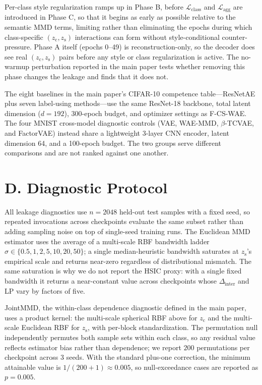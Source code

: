 \documentclass[letterpaper]{article} %
\newcommand{\ours}{F-CS-WAE}
\newcommand{\zc}{z_{\mathrm{c}}}
\newcommand{\zs}{z_{\mathrm{s}}}
\newcommand{\Dinter}{\Delta_{\mathrm{inter}}}
\begin{document}
Per-class style regularization ramps up in Phase B, before
$\mathcal{L}_{\mathrm{class}}$ and $\mathcal{L}_{\mathrm{agg}}$ are
introduced in Phase C, so that it begins as early as possible relative to the
semantic MMD terms, limiting rather than eliminating the epochs during which
class-specific $(\zc,\zs)$ interactions can form without style-conditional
counter-pressure. Phase A itself (epochs 0--49) is reconstruction-only, so
the decoder does see real $(\zc,\zs)$ pairs before any style or class
regularization is active. The no-warmup perturbation reported in the main
paper tests whether removing this phase changes the leakage and finds that it
does not.

The eight baselines in the main paper's CIFAR-10 competence table---ResNetAE
plus seven label-using methods---use the same ResNet-18 backbone, total latent
dimension ($d{=}192$), 300-epoch budget, and optimizer settings as \ours{}.
The four MNIST cross-model diagnostic controls (VAE, WAE-MMD,
$\beta$-TCVAE, and FactorVAE) instead share a lightweight 3-layer CNN encoder,
latent dimension 64, and a 100-epoch budget. The two groups serve different
comparisons and are not ranked against one another.

\section{D. Diagnostic Protocol}

All leakage diagnostics use $n{=}2048$ held-out test samples with a fixed
seed, so repeated invocations across checkpoints evaluate the same subset
rather than adding sampling noise on top of single-seed training runs. The
Euclidean MMD estimator uses the average of a multi-scale RBF bandwidth
ladder $\sigma\in\{0.5,1,2,5,10,20,50\}$; a single median-heuristic
bandwidth saturates at $\zs$'s empirical scale and returns near-zero
regardless of distributional mismatch. The same saturation is why we do not
report the HSIC proxy: with a single fixed bandwidth it returns a
near-constant value across checkpoints whose $\Dinter$ and LP vary by factors
of five.

JointMMD, the within-class dependence diagnostic defined in the main paper,
uses a product kernel: the multi-scale
spherical RBF above for $\zc$ and the multi-scale Euclidean RBF for $\zs$,
with per-block standardization. The permutation null independently
permutes both sample sets within each class, so any residual value reflects
estimator bias rather than dependence; we report $200$ permutations per
checkpoint across 3 seeds. With the standard plus-one correction, the minimum
attainable value is $1/(200+1)\approx0.005$, so null-exceedance cases are
reported as $p{=}0.005$.
\end{document}

